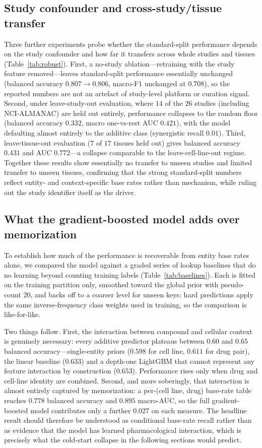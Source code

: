\documentclass{bmcart}
\begin{document}
\subsection*{Study confounder and cross-study/tissue transfer}
Three further experiments probe whether the standard-split performance depends on the study confounder
and how far it transfers across whole studies and tissues (Table~\ref{tab:robust}). First, a no-study
ablation---retraining with the study feature removed---leaves standard-split performance essentially
unchanged (balanced accuracy $0.807\rightarrow0.806$, macro-F1 unchanged at $0.708$), so the reported
numbers are not an artefact of study-level platform or curation signal. Second, under leave-study-out
evaluation, where $14$ of the $26$ studies (including NCI-ALMANAC) are held out entirely, performance
collapses to the random floor (balanced accuracy $0.332$, macro one-vs-rest AUC $0.421$), with the
model defaulting almost entirely to the additive class (synergistic recall $0.01$). Third,
leave-tissue-out evaluation ($7$ of $17$ tissues held out) gives balanced accuracy $0.431$ and AUC
$0.772$---a collapse comparable to the leave-cell-line-out regime. Together these results show
essentially no transfer to unseen studies and limited transfer to unseen tissues, confirming that the
strong standard-split numbers reflect entity- and context-specific base rates rather than mechanism,
while ruling out the study identifier itself as the driver.

\subsection*{What the gradient-boosted model adds over memorization}
To establish how much of the performance is recoverable from entity base rates alone, we compared the
model against a graded series of lookup baselines that do no learning beyond counting training labels
(Table~\ref{tab:baselines}). Each is fitted on the training partition only, smoothed toward the global
prior with pseudo-count $20$, and backs off to a coarser level for unseen keys; hard predictions apply
the same inverse-frequency class weights used in training, so the comparison is like-for-like.

Two things follow. First, the interaction between compound and cellular context is genuinely necessary:
every additive predictor plateaus between $0.60$ and $0.65$ balanced accuracy---single-entity priors
($0.598$ for cell line, $0.611$ for drug pair), the linear baseline ($0.633$) and a depth-one LightGBM
that cannot represent any feature interaction by construction ($0.653$). Performance rises only when
drug and cell-line identity are combined. Second, and more soberingly, that interaction is almost
entirely captured by memorization: a per-(cell line, drug) base-rate table reaches $0.778$ balanced
accuracy and $0.895$ macro-AUC, so the full gradient-boosted model contributes only a further $0.027$
on each measure. The headline result should therefore be understood as conditional base-rate recall
rather than as evidence that the model has learned pharmacological interaction, which is precisely what
the cold-start collapse in the following sections would predict.
\end{document}
